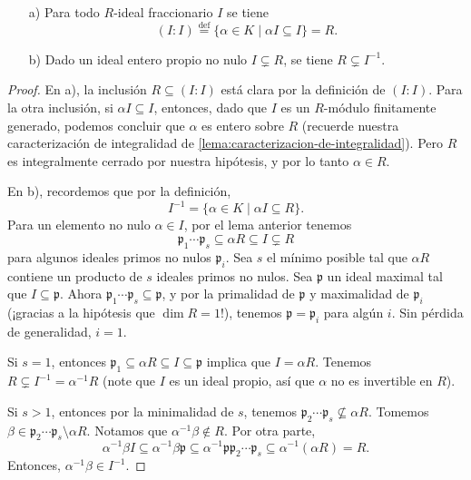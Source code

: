 \begin{lema}
  \begin{enumerate}
  \item[a)] Para todo $R$-ideal fraccionario $I$ se tiene
    \[ (I : I) \stackrel{\text{def}}{=}
           \{ \alpha \in K \mid \alpha I \subseteq I \} = R. \]
           
  \item[b)] Dado un ideal entero propio no nulo $I \subsetneq R$, se tiene
    $R \subsetneq I^{-1}$.
  \end{enumerate}

  \begin{proof}
    En a), la inclusión $R \subseteq (I : I)$ está clara por la definición de
    $(I : I)$. Para la otra inclusión, si $\alpha I \subseteq I$, entonces, dado
    que $I$ es un $R$-módulo finitamente generado, podemos concluir que $\alpha$
    es entero sobre $R$ (recuerde nuestra caracterización de integralidad de
    \ref{lema:caracterizacion-de-integralidad}). Pero $R$ es integralmente
    cerrado por nuestra hipótesis, y por lo tanto $\alpha \in R$.

    En b), recordemos que por la definición,
    $$I^{-1} = \{ \alpha \in K \mid \alpha I \subseteq R \}.$$
    Para un elemento no nulo $\alpha \in I$, por el lema anterior tenemos
    \[ \mathfrak{p}_1\cdots\mathfrak{p}_s \subseteq \alpha R
           \subseteq I \subsetneq R \]
    para algunos ideales primos no nulos $\mathfrak{p}_i$. Sea $s$ el mínimo
    posible tal que $\alpha R$ contiene un producto de $s$ ideales primos no
    nulos. Sea $\mathfrak{p}$ un ideal maximal tal que
    $I \subseteq \mathfrak{p}$. Ahora
    $\mathfrak{p}_1\cdots\mathfrak{p}_s \subseteq \mathfrak{p}$,
    y por la primalidad de $\mathfrak{p}$ y maximalidad de $\mathfrak{p}_i$
    (¡gracias a la hipótesis que $\dim R = 1$!), tenemos
    $\mathfrak{p} = \mathfrak{p}_i$ para algún $i$. Sin pérdida de generalidad,
    $i = 1$.

    Si $s = 1$, entonces
    $\mathfrak{p}_1 \subseteq \alpha R \subseteq I \subseteq \mathfrak{p}$
    implica que $I = \alpha R$. Tenemos $R \subsetneq I^{-1} = \alpha^{-1} R$
    (note que $I$ es un ideal propio, así que $\alpha$ no es invertible en $R$).

    Si $s > 1$, entonces por la minimalidad de $s$, tenemos
    $\mathfrak{p}_2\cdots\mathfrak{p}_s \not\subseteq \alpha R$. Tomemos
    $\beta \in \mathfrak{p}_2\cdots\mathfrak{p}_s \setminus \alpha R$.
    Notamos que $\alpha^{-1}\beta \notin R$. Por otra parte,
    \[ \alpha^{-1}\beta I \subseteq \alpha^{-1}\beta\mathfrak{p}
       \subseteq \alpha^{-1} \mathfrak{p}\mathfrak{p}_2\cdots\mathfrak{p}_s
       \subseteq \alpha^{-1} (\alpha R) = R. \]
    Entonces, $\alpha^{-1}\beta \in I^{-1}$.
  \end{proof}
\end{lema}

